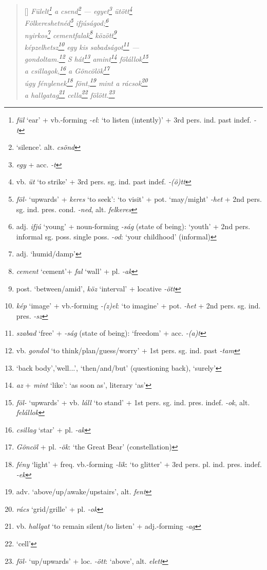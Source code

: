 \documentclass[a4paper,12pt,twoside,final]{book}
\begin{document}
\begin{verse}[\versewidth]
  \it
  Fülelt\footnote{\emph{fül} `ear' + vb.-forming \emph{-el}: `to
  listen (intently)' + 3rd pers. ind. past indef. \emph{-t}} a
  csend\footnote{`silence'. alt. \emph{csönd}}
  --- egyet\footnote{\emph{egy} + acc. \emph{-t}}
  ütött\footnote{vb. \emph{üt} `to strike' + 3rd
  pers. sg. ind. past indef. \emph{-(ö)tt}} \\
  Fölkereshetnéd\footnote{\emph{föl-}
  `upwards' + \emph{keres} `to seek': `to visit' +
  pot. `may/might' \emph{-het} + 2nd
  pers. sg. ind. pres. cond. \emph{-ned}, alt. \emph{felkeres}}
  ifjúságod;\footnote{adj. \emph{ifjú} `young' + noun-forming
  \emph{-ság} (state of being): `youth' + 2nd pers. informal sg.
  poss. single poss. \emph{-od}: `your childhood' (informal)} \\
  nyirkos\footnote{adj. `humid/damp'}
  cementfalak\footnote{\emph{cement} `cement'+ \emph{fal} `wall' +
  pl. \emph{-ak}} között\footnote{post. `between/amid', \emph{köz}
  `interval' + locative \emph{-ött}} \\
  képzelhetsz\footnote{\emph{kép} `image' + vb.-forming
  \emph{-(z)el}: `to imagine' + pot. \emph{-het} + 2nd
  pers. sg. ind. pres. \emph{-sz}} egy kis
  sabadságot\footnote{\emph{szabad} `free' + \emph{-ság} (state of
  being): `freedom' + acc. \emph{-(a)t}} --- \\
  gondoltam.\footnote{vb. \emph{gondol} `to
  think/plan/guess/worry' + 1st pers. sg. ind. past
  \emph{-tam}} S hát\footnote{`back body','well...',
  `then/and/but' (questioning back), `surely'}
  amint\footnote{\emph{az} + \emph{mint} `like': `as soon as',
  literary `as'} fölállok\footnote{\emph{föl-}
  `upwards' +  vb. \emph{láll} `to stand' + 1st
  pers. sg. ind. pres. indef. \emph{-ok}, alt. \emph{felállok}} \\
  a csillagok,\footnote{\emph{csillag} `star' + pl. \emph{-ak}} a
  Göncölök\footnote{\emph{Göncöl} + pl. \emph{-ök}: `the Great Bear'
  (constellation)} \\
  úgy fénylenek\footnote{\emph{fény} `light' +
  freq. vb.-forming \emph{-lik}: `to glitter' + 3rd
  pers. pl. ind. pres. indef. \emph{-ek}}
  fönt,\footnote{adv. `above/up/awake/upstairs', alt. \emph{fent}}
  mint a rácsok\footnote{\emph{rács} `grid/grille' + pl. \emph{-ok}} \\
  a hallgatag\footnote{vb. \emph{hallgat} `to remain silent/to
  listen' + adj.-forming \emph{-ag}} cella\footnote{`cell'}
  fölött.\footnote{\emph{föl-} `up/upwards' +  loc. \emph{-ött}:
  `above', alt. \emph{elett}} \\
\end{verse}
\end{document}
